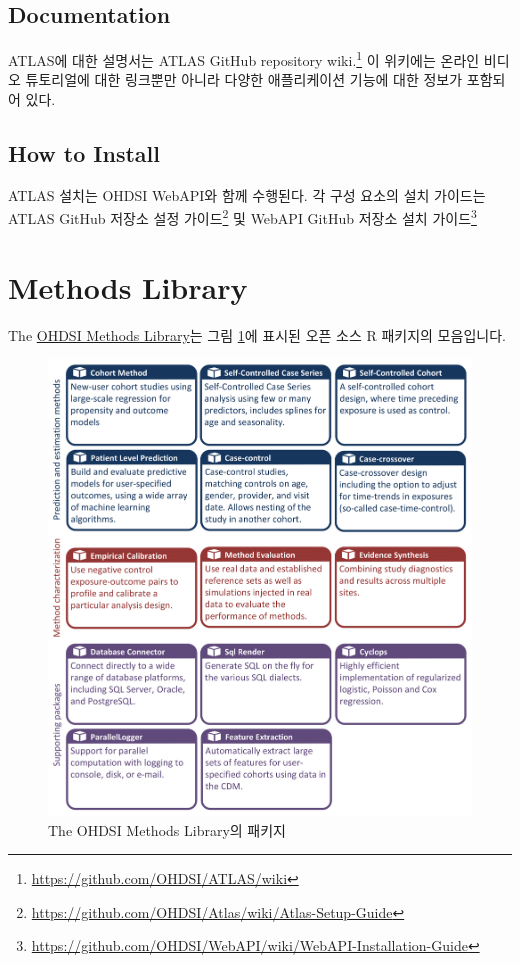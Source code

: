 \documentclass[11pt]{book}
\let\rmarkdownfootnote\footnote%
\def\footnote{\protect\rmarkdownfootnote}
\theoremstyle{definition}
\theoremstyle{definition}
\theoremstyle{definition}
\theoremstyle{remark}
\begin{document}
\subsection{Documentation}\label{documentation}

ATLAS에 대한 설명서는 ATLAS GitHub repository wiki.\footnote{\url{https://github.com/OHDSI/ATLAS/wiki}}
이 위키에는 온라인 비디오 튜토리얼에 대한 링크뿐만 아니라 다양한
애플리케이션 기능에 대한 정보가 포함되어 있다.

\subsection{How to Install}\label{how-to-install}

ATLAS 설치는 OHDSI WebAPI와 함께 수행된다. 각 구성 요소의 설치 가이드는
ATLAS GitHub 저장소 설정 가이드\footnote{\url{https://github.com/OHDSI/Atlas/wiki/Atlas-Setup-Guide}}
및 WebAPI GitHub 저장소 설치 가이드\footnote{\url{https://github.com/OHDSI/WebAPI/wiki/WebAPI-Installation-Guide}}

\section{Methods Library}\label{methods-library}

The \href{https://ohdsi.github.io/MethodsLibrary/}{OHDSI Methods
Library}는 그림 \ref{fig:methodsLibrary}에 표시된 오픈 소스 R 패키지의
모음입니다. 

\begin{figure}

{\centering \includegraphics[width=1\linewidth]{images/OhdsiAnalyticsTools/methodsLibrary} 

}

\caption{The OHDSI Methods Library의 패키지}\label{fig:methodsLibrary}
\end{figure}
\end{document}
